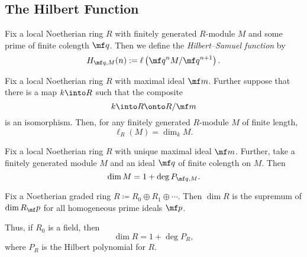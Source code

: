 \documentclass{article}
\begin{document}
\subsection{The Hilbert Function}
\begin{definition*}
	Fix a local Noetherian ring $R$ with finitely generated $R$-module $M$ and some prime of finite colength $\mf q$. Then we define the \textit{Hilbert--Samuel function} by
	\[H_{\mf q,M}(n):=\ell\left(\mf q^nM/\mf q^{n+1}\right).\]
\end{definition*}
\begin{lemma*}
	Fix a local Noetherian ring $R$ with maximal ideal $\mf m$. Further suppose that there is a map $k\into R$ such that the composite
	\[k\into R\onto R/\mf m\]
	is an isomorphism. Then, for any finitely generated $R$-module $M$ of finite length,
	\[\ell_R(M)=\dim_kM.\]
\end{lemma*}
\begin{theorem*}[Theorem 12.4]
	Fix a local Noetherian ring $R$ with unique maximal ideal $\mf m$. Further, take a finitely generated module $M$ and an ideal $\mf q$ of finite colength on $M$. Then
	\[\dim M=1+\deg P_{\mf q,M}.\]
\end{theorem*}
\begin{cor*}[Corollary 13.7]
	Fix a Noetherian graded ring $R\coloneqq R_0\oplus R_1\oplus\cdots$. Then $\dim R$ is the supremum of $\dim R_\mf p$ for all homogeneous prime ideals $\mf p$.

	Thus, if $R_0$ is a field, then
	\[\dim R=1+\deg P_R,\]
	where $P_R$ is the Hilbert polynomial for $R$.
\end{cor*}
\end{document}
